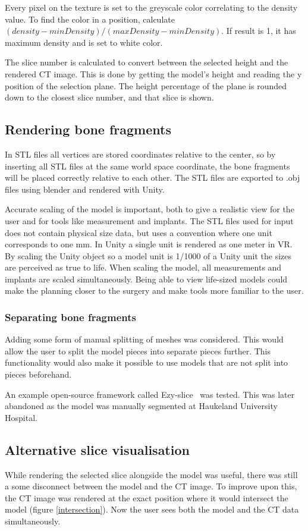 \documentclass[a4paper]{report}
\begin{document}
Every pixel on the texture is set to the greyscale color correlating to the density value. To find the color in a position, calculate $(density-minDensity)/(maxDensity-minDensity)$.
If result is 1, it has maximum density and is set to white color.


The slice number is calculated to convert between the selected height and the rendered CT image. This is done by getting the model's height and reading the y position of the selection plane. The height percentage of the plane is rounded down to the closest slice number, and that slice is shown.

\subsection{Rendering bone fragments}
In STL files all vertices are stored coordinates relative to the center, so by inserting all STL files at the same world space coordinate, the bone fragments will be placed correctly relative to each other. The STL files are exported to .obj files using blender and rendered with Unity.

Accurate scaling of the model is important, both to give a realistic view for the user and for tools like measurement and implants. The STL files used for input does not contain physical size data, but uses a convention where one unit corresponds to one mm. In Unity a single unit is rendered as one meter in VR. By scaling the Unity object so a model unit is 1/1000 of a Unity unit the sizes are perceived as true to life. When scaling the model, all measurements and implants are scaled simultaneously.
Being able to view life-sized models could make the planning closer to the surgery and make tools more familiar to the user.

\subsubsection{Separating bone fragments}
Adding some form of manual splitting of meshes was considered. This would allow the user to split the model pieces into separate pieces further. This functionality would also make it possible to use models that are not split into pieces beforehand.

An example open-source framework called Ezy-slice~\cite{arayan_davidarayanezy-slice_2022} was tested. This was later abandoned as the model was manually segmented at Haukeland University Hospital.

\subsection{Alternative slice visualisation}
While rendering the selected slice alongside the model was useful, there was still a some disconnect between the model and the CT image. 
To improve upon this, the CT image was rendered at the exact position where it would intersect the model (figure \ref{intersection}). Now the user sees both the model and the CT data simultaneously.
\end{document}
